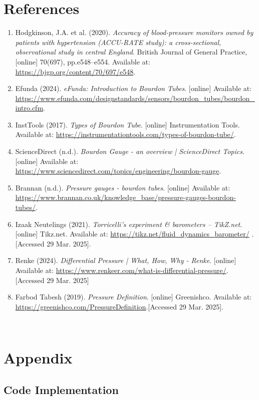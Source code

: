 \documentclass{article}
\begin{document}
	
	\newpage
	\section{References}	
	\begin{enumerate}
		\item Hodgkinson, J.A. et al. (2020). \textit{Accuracy of blood-pressure monitors owned by patients with hypertension (ACCU-RATE study): a cross-sectional, observational study in central England}. British Journal of General Practice, [online] 70(697), pp.e548–e554. Available at: \url{https://bjgp.org/content/70/697/e548}.
		\item Efunda (2024). \textit{eFunda: Introduction to Bourdon Tubes}. [online] Available at: \url{https://www.efunda.com/designstandards/sensors/bourdon_tubes/bourdon_intro.cfm}.
		\item InstTools (2017). \textit{Types of Bourdon Tube}. [online] Instrumentation Tools. Available at: \url{https://instrumentationtools.com/types-of-bourdon-tube/}.
		\item ScienceDirect (n.d.). \textit{Bourdon Gauge - an overview | ScienceDirect Topics}. [online] Available at: \url{https://www.sciencedirect.com/topics/engineering/bourdon-gauge}.
		‌\item Brannan (n.d.). \textit{Pressure gauges - bourdon tubes}. [online] Available at: \url{https://www.brannan.co.uk/knowledge_base/pressure-gauges-bourdon-tubes/}.
		\item Izaak Neutelings (2021). \textit{Torricelli’s experiment \& barometers – TikZ.net}. [online] Tikz.net. Available at: \url{https://tikz.net/fluid_dynamics_barometer/} .[Accessed 29 Mar. 2025].
		\item Renke (2024). \textit{Differential Pressure | What, How, Why - Renke}. [online] Available at: \url{https://www.renkeer.com/what-is-differential-pressure/}.[Accessed 29 Mar. 2025]
		\item Farbod Tabesh (2019). \textit{Pressure Definition}. [online] Greenishco. Available at: \url{https://greenishco.com/PressureDefinition}.[Accessed 29 Mar. 2025].	‌
	\end{enumerate}
	‌	
	\newpage
	
\section{Appendix}
\renewcommand{\thesubsection}{\Alph{subsection}}
\normalsize
\subsection{Code Implementation}\label{subsec:code}
\end{document}
